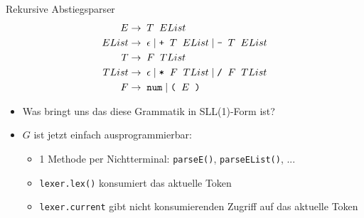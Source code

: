 \documentclass{beamer}
\begin{document}
\begin{frame}{Rekursive Abstiegsparser}
	\footnotesize
	\begin{align*}
		E     \to & \;\; T \;\; EList\\
		EList \to & \;\; \epsilon \mid \textrm{\texttt{+}} \;\; T \;\; EList \mid \textrm{\texttt{-}} \;\; T \;\; EList\\
		T     \to & \;\; F \;\; TList\\
		TList \to & \;\; \epsilon \mid \textrm{\texttt{*}} \;\; F \;\; TList \mid \textrm{\texttt{/}} \;\; F \;\; TList\\
		F \to & \;\; \textrm{\texttt{num}} \; | \; \textrm{\texttt{(}} \;\; E \;\; \textrm{\texttt{)}}
	\end{align*}
	\begin{itemize}
            \pause
            \item Was bringt uns das diese Grammatik in SLL(1)-Form ist?
            \pause
		\item $G$ ist jetzt einfach ausprogrammierbar:
		\begin{itemize}
			\item 1 Methode per Nichtterminal: \texttt{parseE()}, \texttt{parseEList()}, ...
			\item \texttt{lexer.lex()} konsumiert das aktuelle Token
			\item \texttt{lexer.current} gibt nicht konsumierenden Zugriff auf das aktuelle Token
		\end{itemize}
	\end{itemize}
\end{frame}
\end{document}

